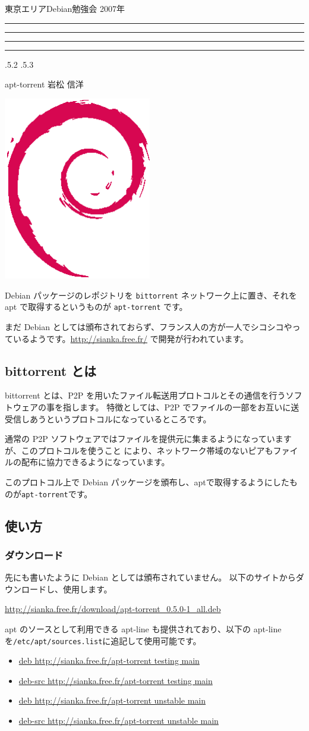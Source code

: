 \documentclass[mingoth,a4paper]{jsarticle}
\makeatletter
\newcommand{\debmtgyear}{2007}
\renewcommand{\section}{\@startsection{section}{1}{\z@}%
    {\Cvs \@plus.5\Cdp \@minus.2\Cdp}%
    {.5\Cvs \@plus.3\Cdp}%
    {\normalfont\Huge\headfont\raggedright\centering}} %
\newcommand{\dancersection}[2]{%
\newpage
東京エリアDebian勉強会 \debmtgyear{}年
\hrule
\vspace{0.5mm}
\hrule
%
\vspace{4cm}
\hrule
\vspace{0.5mm}
\hrule
%
\vspace{-7cm}
\begin{minipage}[b]{0.7\hsize}
\section{#1}
\hfill{}#2\\
\vspace{2cm}
\end{minipage}
\begin{minipage}[b]{0.3\hsize}
\hfill{}\includegraphics[height=8cm]{image200502/openlogo-nd.eps}\\
\end{minipage}
%
\vspace{-1cm}
}
\makeatother
\begin{document}
\dancersection{apt-torrent}{岩松 信洋}
\label{sec:apt-torrnet}

Debian パッケージのレポジトリを \texttt{bittorrent} ネットワーク上に置き、それを apt で取得するというものが \texttt{apt-torrent} です。

まだ Debian としては頒布されておらず、フランス人の方が一人でシコシコやっているようです。\url{http://sianka.free.fr/} で開発が行われています。

\subsection{bittorrent とは}
bittorrent とは、P2P を用いたファイル転送用プロトコルとその通信を行うソフトウェアの事を指します。
特徴としては、P2P でファイルの一部をお互いに送受信しあうというプロトコルになっているところです。

通常の P2P ソフトウェアではファイルを提供元に集まるようになっていますが、このプロトコルを使うこと
により、ネットワーク帯域のないピアもファイルの配布に協力できるようになっています。

このプロトコル上で Debian パッケージを頒布し、aptで取得するようにしたものが\texttt{apt-torrent}です。

\subsection{使い方}

\subsubsection{ダウンロード}
先にも書いたように Debian としては頒布されていません。
以下のサイトからダウンロードし、使用します。

\url{http://sianka.free.fr/download/apt-torrent_0.5.0-1_all.deb}

apt のソースとして利用できる apt-line も提供されており、以下の apt-line
を\texttt{/etc/apt/sources.list}に追記して使用可能です。
\begin{itemize}
	\item \url{deb http://sianka.free.fr/apt-torrent testing main}
	\item \url{deb-src http://sianka.free.fr/apt-torrent testing main}
	\item \url{deb http://sianka.free.fr/apt-torrent unstable main}
	\item \url{deb-src http://sianka.free.fr/apt-torrent unstable main}
\end{itemize}
\end{document}
